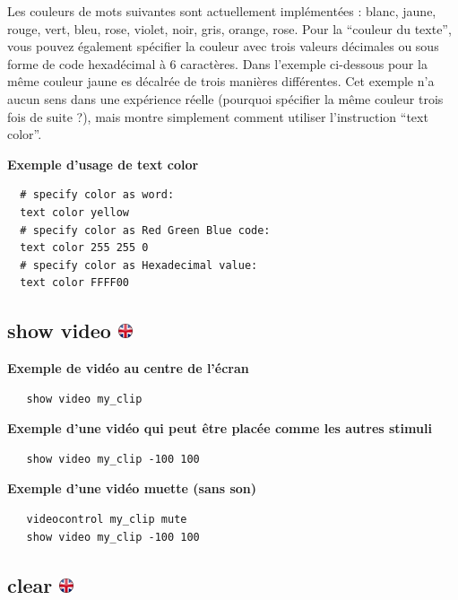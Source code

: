 \documentclass[
]{book}
\begin{document}
Les couleurs de mots suivantes sont actuellement implémentées : blanc, jaune, rouge, vert, bleu, rose, violet, noir, gris, orange, rose.
Pour la ``couleur du texte'', vous pouvez également spécifier la couleur avec trois valeurs décimales ou sous forme de code hexadécimal à 6 caractères. Dans l'exemple ci-dessous pour la même couleur jaune es décalrée de trois manières différentes. Cet exemple n'a aucun sens dans une expérience réelle (pourquoi spécifier la même couleur trois fois de suite ?), mais montre simplement comment utiliser l'instruction ``text color''.

\textbf{Exemple d'usage de text color}

\begin{verbatim}
  # specify color as word:
  text color yellow
  # specify color as Red Green Blue code:
  text color 255 255 0
  # specify color as Hexadecimal value:
  text color FFFF00
\end{verbatim}

\hypertarget{show-video}{%
\subsection[show video ]{\texorpdfstring{show video \href{https://www.psytoolkit.org/doc3.2.0/syntax.html\#task-show-video}{\protect\includegraphics{img/ukflag.png}}}{show video }}\label{show-video}}

\textbf{Exemple de vidéo au centre de l'écran}

\begin{verbatim}
   show video my_clip
\end{verbatim}

\textbf{Exemple d'une vidéo qui peut être placée comme les autres stimuli}

\begin{verbatim}
   show video my_clip -100 100
\end{verbatim}

\textbf{Exemple d'une vidéo muette (sans son)}

\begin{verbatim}
   videocontrol my_clip mute
   show video my_clip -100 100
\end{verbatim}

\hypertarget{clear}{%
\subsection[clear ]{\texorpdfstring{clear \href{https://www.psytoolkit.org/doc3.2.0/syntax.html\#task-clear}{\protect\includegraphics{img/ukflag.png}}}{clear }}\label{clear}}
\end{document}
